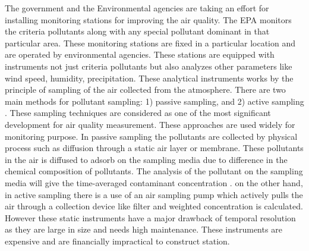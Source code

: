 The government and the Environmental agencies are taking an effort for installing monitoring stations for improving the air quality. The EPA monitors the criteria pollutants along with any special pollutant dominant in that particular area. These monitoring stations are fixed in a particular location and are operated by environmental agencies. These stations are equipped with instruments not just criteria pollutants but also analyzes other parameters like wind speed, humidity, precipitation. These analytical instruments works by the principle of sampling of the air collected from the atmosphere.
There are two main methods for pollutant sampling: 1) passive sampling, and 2) active sampling \cite{Balakrishnan2015} \cite{activepassive}. These sampling techniques are considered as one of the most significant development for air quality measurement. These approaches are used widely for monitoring purpose. In passive sampling the pollutants are collected by physical process such as diffusion through a static air layer or membrane. These pollutants in the air is diffused to adsorb on the sampling media due to difference in the chemical composition of pollutants. The analysis of the pollutant on the sampling media will give the time-averaged contaminant concentration \cite{Environment2009}. on the other hand, in active sampling there is a use of an air sampling pump which actively pulls the air through a collection device like filter  and weighted concentration is calculated. However these static instruments have a major drawback of temporal resolution as they are large in size and needs high maintenance. These instruments are expensive and are financially impractical to construct station.

